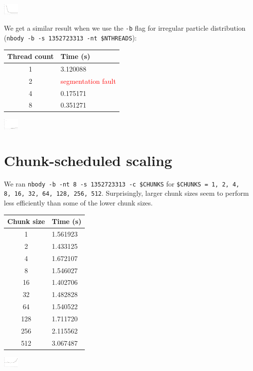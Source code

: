 \documentclass{article}[12pt;letterpaper]
\begin{document}
\includegraphics[width=0.3in]{a2_sec1_1.png}

We get a similar result when we use the \texttt{-b} flag for irregular
particle distribution (\texttt{nbody -b -s 1352723313 -nt \$NTHREADS}):

\begin{tabular}{c l}
Thread count & Time (s) \\
\hline{}
1 & 3.120088 \\
2 & \textcolor{red}{segmentation fault} \\ %
4 & 0.175171 \\
8 & 0.351271
\end{tabular}

\includegraphics[width=0.3in]{a2_sec1_2.png}

\section{Chunk-scheduled scaling}

We ran \texttt{nbody -b -nt 8 -s 1352723313 -c \$CHUNKS} for \texttt{\$CHUNKS =
1, 2, 4, 8, 16, 32, 64, 128, 256, 512}. Surprisingly, larger chunk sizes seem
to perform less efficiently than some of the lower chunk sizes.

\begin{tabular}{c l}
Chunk size & Time (s) \\
\hline{}
  1 & 1.561923 \\
  2 & 1.433125 \\
  4 & 1.672107 \\
  8 & 1.546027 \\
 16 & 1.402706 \\
 32 & 1.482828 \\
 64 & 1.540522 \\
128 & 1.711720 \\
256 & 2.115562 \\
512 & 3.067487
\end{tabular}

\includegraphics[width=0.3in]{a2_sec2_1.png}
\end{document}
